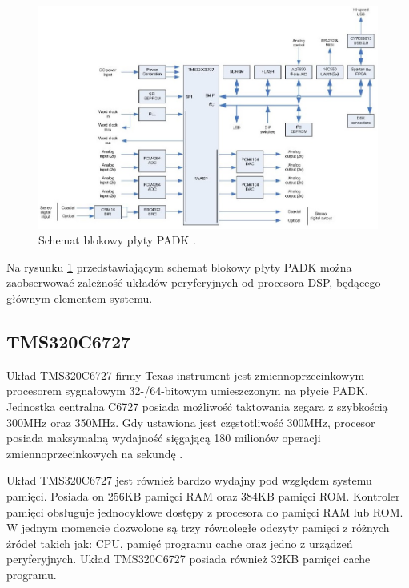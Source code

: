\begin{figure}[H]
	\centering
	\includegraphics[width=16cm]{./grafiki/real_PADK_block}
	\captionsetup{justification=centering}
	\caption{Schemat blokowy płyty PADK \cite{dokumentacja_PADK}.}
	\label{rys:real_padk}
\end{figure}

Na rysunku \ref{rys:real_padk} przedstawiającym schemat blokowy płyty PADK można zaobserwować zależność układów peryferyjnych od procesora DSP, będącego głównym elementem systemu.

\subsection{TMS320C6727}
Układ TMS320C6727 firmy Texas instrument jest zmiennoprzecinkowym procesorem sygnałowym 32-/64-bitowym umieszczonym na płycie PADK. Jednostka centralna C6727 posiada możliwość taktowania zegara z szybkością 300MHz oraz 350MHz. Gdy ustawiona jest częstotliwość 300MHz, procesor posiada maksymalną wydajność sięgającą 180 milionów operacji zmiennoprzecinkowych na sekundę \cite{dokumentacja_ti6727}.

Układ TMS320C6727 jest również bardzo wydajny pod względem systemu pamięci. Posiada on 256KB pamięci RAM oraz 384KB pamięci ROM. Kontroler pamięci obsługuje jednocyklowe dostępy z procesora do pamięci  RAM lub ROM. W jednym momencie dozwolone są trzy równoległe odczyty pamięci z różnych źródeł takich jak: CPU, pamięć programu cache oraz jedno z urządzeń peryferyjnych. Układ TMS320C6727 posiada również 32KB pamięci cache programu.

